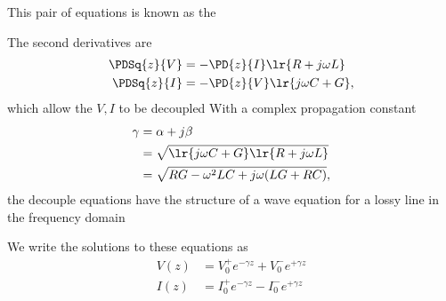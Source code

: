 This pair of equations is known as the 

The second derivatives are
\begin{equation}\label{eqn:uwaves4TransmissionLines:120}
\begin{aligned}
\PDSq{z}{V} &= -\PD{z}{I} \lr{ R + j \omega L } \\
\PDSq{z}{I} &= -\PD{z}{V} \lr{ j \omega C + G},
\end{aligned}
\end{equation}
which allow the \( V, I \) to be decoupled
With a complex propagation constant
\begin{equation}\label{eqn:uwaves4TransmissionLines:160}
\begin{aligned}
\gamma
&= \alpha + j \beta
\\ &= \sqrt{ \lr{ j \omega C + G} \lr{ R + j \omega L } }
\\ &=
\sqrt{ R G - \omega^2 L C + j \omega ( L G + R C ) },
\end{aligned}
\end{equation}
the decouple equations have the structure of a wave equation for a lossy line in the frequency domain

We write the solutions to these equations as
\begin{equation}\label{eqn:uwaves4TransmissionLines:200}
\begin{aligned}
V(z) &= V_0^{+} e^{-\gamma z} + V_0^{-} e^{+\gamma z} \\
I(z) &= I_0^{+} e^{-\gamma z} - I_0^{-} e^{+\gamma z} \\
\end{aligned}
\end{equation}

